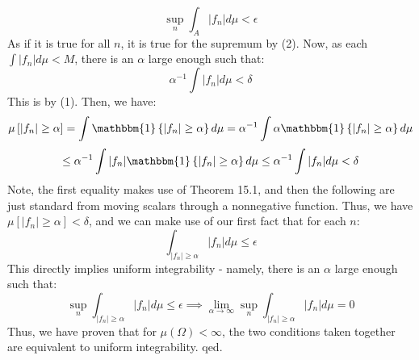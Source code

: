 \documentclass[12pt,a4paper]{article}
\newcommand{\1}[1]{\mathbbm{1}\left\{ #1 \right\}}
\begin{document}
$$
	\sup_n \int_A |f_n| d\mu < \epsilon
$$
As if it is true for all $n$, it is true for the supremum by (2). Now, as each $\int |f_n| d\mu < M$, there is an $\alpha$ large enough such that:
$$
	\alpha^{-1} \int |f_n| d\mu < \delta
$$
This is by (1). Then, we have:
$$
	\mu\left[|f_n| \geq \alpha\right] = \int \1{|f_n| \geq \alpha} d\mu =
	\alpha^{-1} \int \alpha \1{|f_n| \geq \alpha} d\mu
$$
$$
	\leq \alpha^{-1} \int |f_n|\1{|f_n| \geq \alpha} d\mu
	\leq \alpha^{-1} \int |f_n| d\mu < \delta
$$
Note, the first equality makes use of Theorem 15.1, and then the following are just standard from moving scalars through a nonnegative function. Thus, we have $\mu\left[|f_n| \geq \alpha\right] < \delta$, and we can make use of our first fact that for each $n$:
$$
	\int_{|f_n| \geq \alpha} |f_n| d\mu \leq \epsilon
$$
This directly implies uniform integrability - namely, there is an $\alpha$ large enough such that:
$$
	\sup_n \int_{|f_n| \geq \alpha} |f_n| d\mu \leq \epsilon \implies
	\lim_{\alpha \to \infty} \sup_n \int_{|f_n| \geq \alpha} |f_n| d\mu = 0
$$
Thus, we have proven that for $\mu(\Omega) < \infty$, the two conditions taken together are equivalent to uniform integrability. qed.
\end{document}
